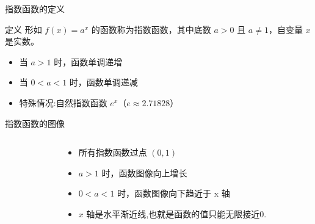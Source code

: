 


\begin{frame}{指数函数的定义}
    \begin{block}{定义}
        形如 \( f(x) = a^x \) 的函数称为指数函数，其中底数 \( a > 0 \) 且 \( a \neq 1 \)，自变量 \( x \) 是实数。
    \end{block}
    
    \begin{itemize}
        \item 当 \( a > 1 \) 时，函数单调递增
        \item 当 \( 0 < a < 1 \) 时，函数单调递减
        \item 特殊情况:自然指数函数 \( e^x \)（\( e \approx 2.71828 \)）
    \end{itemize}
  \end{frame}
  
  
  
  \begin{frame}{指数函数的图像}
    \begin{columns}
        \begin{column}{0.5\textwidth}
        \end{column}
        \begin{column}{0.5\textwidth}
            \begin{itemize}
                \item 所有指数函数过点 \((0,1)\)
                \item \( a > 1 \) 时，函数图像向上增长
                \item \( 0 < a < 1 \) 时，函数图像向下趋近于 x 轴
                \item $x$ 轴是水平渐近线,也就是函数的值只能无限接近$0$.
            \end{itemize}
        \end{column}
    \end{columns}
  \end{frame}
  
